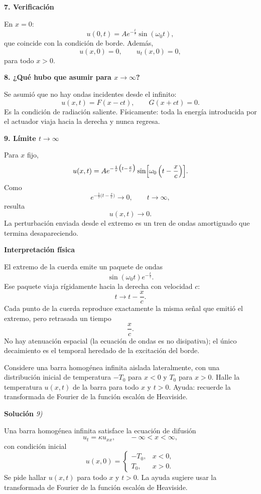 \documentclass[11pt,spanish]{article}
\newcounter{problema}
\newcommand{\prob}{\stepcounter{problema} \vspace{.5cm} \noindent{\bf Problema \arabic{problema}: }}
\begin{document}
{\bf 7. Verificación}

En $x=0$:
$$
u(0,t)
=
A e^{-\frac{t}{\tau}}\sin(\omega_0 t),
$$
que coincide con la condición de borde.
Además,
$$
u(x,0)=0,
\qquad
u_t(x,0)=0,
$$
para todo $x>0$.

{\bf 8. ¿Qué hubo que asumir para $x\to\infty$?}

Se asumió que no hay ondas incidentes desde el infinito:
$$
\boxed{
u(x,t)=F(x-ct),
\qquad
G(x+ct)=0.
}
$$
Es la condición de radiación saliente.
Físicamente: toda la energía introducida por el actuador viaja hacia la derecha y nunca regresa.

{\bf 9. Límite $t\to\infty$}

Para $x$ fijo,
$$
u(x,t)
=
A
e^{-\frac{1}{\tau}\big(t-\frac{x}{c}\big)}
\sin\Bigl[\omega_0\left(t-\frac{x}{c}\right)\Bigr].
$$
Como
$$
e^{-\frac{1}{\tau}\big(t-\frac{x}{c}\big)}\to 0,
\qquad
t\to\infty,
$$
resulta
$$
\boxed{
u(x,t)\to0.
}
$$
La perturbación enviada desde el extremo es un tren de ondas amortiguado que termina desapareciendo.

{\bf Interpretación física}

El extremo de la cuerda emite un paquete de ondas
$$
\sin(\omega_0 t)e^{-\frac{t}{\tau}}.
$$
Ese paquete viaja rígidamente hacia la derecha con velocidad $c$:
$$
t \longrightarrow t-\frac{x}{c}.
$$
Cada punto de la cuerda reproduce exactamente la misma señal que emitió el extremo, pero retrasada un tiempo
$$
\frac{x}{c}.
$$
No hay atenuación espacial (la ecuación de ondas es no disipativa); el único decaimiento es el temporal heredado de la excitación del borde.





\prob Considere una barra homogénea infinita aislada lateralmente, con una distribución inicial de temperatura $-T_0$ para $x<0$ y $T_0$ para $x>0$. Halle la temperatura $u(x,t)$ de la barra para todo $x$ y $t>0$. Ayuda: recuerde la transformada de Fourier de la función escalón de Heaviside.

\vspace{0.5cm}
{\bf Soluci\'on }{\em 9)}
\vspace{0.5cm}

Una barra homogénea infinita satisface la ecuación de difusión
$$
u_t=\kappa u_{xx},
\qquad -\infty<x<\infty,
$$
con condición inicial
$$
u(x,0)=
\begin{cases}
-T_0,& x<0,\\
T_0,& x>0.
\end{cases}
$$
Se pide hallar $u(x,t)$ para todo $x$ y $t>0$. 
La ayuda sugiere usar la transformada de Fourier de la función escalón de Heaviside. 
\end{document}
